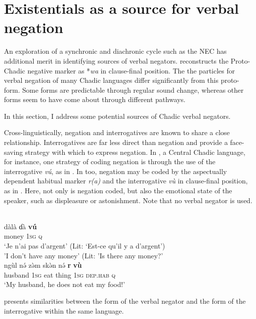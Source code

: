 \documentclass[output=paper,draft,draftmode,colorlinks,citecolor=brown]{langscibook}
\begin{document}
\section{Existentials as a source for verbal negation}\label{sec:3:6}

An exploration of a synchronic and diachronic cycle such as the NEC has additional merit in identifying sources of verbal negators. \citet[30]{Newman1977} reconstructs the Proto-Chadic negative marker as *\textit{wa} in clause-final position. The the particles for verbal negation of many Chadic languages differ significantly from this proto-form. Some forms are predictable through regular sound change, whereas other forms seem to have come about through different pathways. 

 In this section, I address some potential sources of Chadic verbal negators. 

Cross-linguistically, negation and interrogatives are known to share a
close relationship. Interrogatives are far less direct than negation and
provide a face-saving strategy with which to express negation. In
, a Central Chadic language, for instance, one strategy of coding
negation is through the use of the interrogative \textit{v\'u}, as in
. In  too, negation may be coded by the
aspectually dependent habitual marker \textit{r(a)} and the interrogative
\textit{vù} in clause-final position, as in . Here,
not only is negation coded, but also the emotional state of the speaker,
such as displeasure or astonishment. Note that no verbal negator is used.
%

\ea\label{ex:daba-money}
\\
\gll dàlà ɗà
\textbf{v\'u}\\ money 1\textsc{sg} \textsc{q}\\
\glt `Je n'ai pas d'argent'
(Lit: `Est-ce qu'il y a d'argent')\\
'I don't have any money' (Lit: 'Is there any money?'\z
\ea\label{ex:mina-husband}
\\
\gll ngùl
n\'ə z\`əm sk\`ən n\'ə \textbf{r} \textbf{vù}\\ husband 1\textsc{sg}
eat thing 1\textsc{sg} \textsc{dep.hab} \textsc{q}\\
\glt `My husband, he
does not eat my food!' \z

 presents similarities between the form of the verbal negator and the form of the interrogative within the same language.
\end{document}
